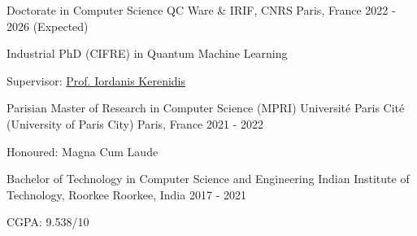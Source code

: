 

\begin{cventries}

  \cventry
    {Doctorate in Computer Science} %
    {QC Ware \& IRIF, CNRS} %
    {Paris, France} %
    {2022 - 2026 (Expected)} %
    {
      \begin{cvitems} %
        \item {Industrial PhD (CIFRE) in Quantum Machine Learning}
        \item {Supervisor: \href{https://scholar.google.com/citations?user=poOHhXMAAAAJ}{Prof. Iordanis Kerenidis}}
      \end{cvitems}
    }

  \cventry
    {Parisian Master of Research in Computer Science (MPRI)} %
    {Université Paris Cité (University of Paris City)} %
    {Paris, France} %
    {2021 - 2022} %
    {
      \begin{cvitems} %
        \item {Honoured: Magna Cum Laude}
      \end{cvitems}
    }

  \cventry
    {Bachelor of Technology in Computer Science and Engineering} %
    {Indian Institute of Technology, Roorkee} %
    {Roorkee, India} %
    {2017 - 2021} %
    {
      \begin{cvitems} %
        \item {CGPA: 9.538/10}
      \end{cvitems}
    }



\end{cventries}
